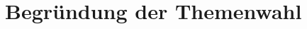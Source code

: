 \documentclass[../Mappe.tex]{subfiles}
\begin{document}
\section{Begründung der Themenwahl}
\end{document}
